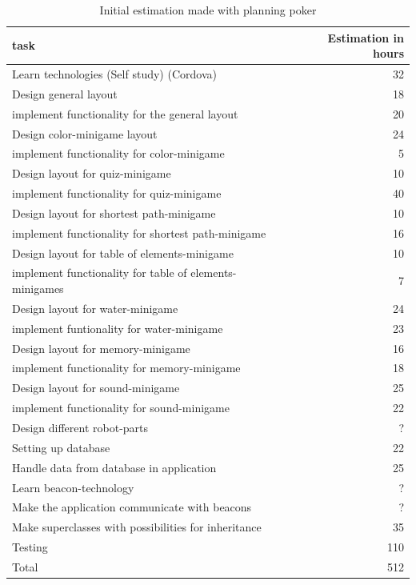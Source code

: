 \begin{center}
\begin{table}[]
\caption{Initial estimation made with planning poker}
\begin{tabular}{ |l|r| } 
\hline
\textbf {task} & \textbf {Estimation in hours} \\
\hline


Learn technologies (Self study) (Cordova) &
32 \\
\hline
Design general layout &
18 \\
\hline
implement functionality for the general layout &
20 \\
\hline
Design color-minigame layout &
24 \\
\hline
implement functionality for color-minigame &
5 \\
\hline
Design layout for quiz-minigame &
10 \\
\hline
implement functionality for quiz-minigame &
40 \\
\hline
Design layout for shortest path-minigame &
10 \\
\hline
implement functionality for shortest path-minigame &
16 \\
\hline
Design layout for table of elements-minigame &
10 \\
\hline
implement functionality for table of elements-minigames &
7 \\
\hline
Design layout for water-minigame &
24 \\
\hline
implement funtionality for water-minigame &
23 \\
\hline
Design layout for memory-minigame &
16 \\
\hline
implement functionality for memory-minigame &
18 \\
\hline
Design layout for sound-minigame &
25 \\
\hline
implement functionality for sound-minigame &
22 \\
\hline
Design different robot-parts &
? \\
\hline
Setting up database &
22 \\
\hline
Handle data from database in application &
25 \\
\hline
Learn beacon-technology &
? \\
\hline
Make the application communicate with beacons &
? \\
\hline
Make superclasses with possibilities for inheritance &
35 \\
\hline
Testing &
110 \\
\hline
Total &
512 \\
\hline


\hline
\end{tabular}
\end{table}
\end{center}



